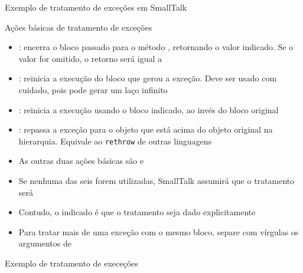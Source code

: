 \begin{frame}[fragile]{Exemplo de tratamento de exceções em SmallTalk}
\end{frame}


\begin{frame}[fragile]{Ações básicas de tratamento de exceções}

    \begin{itemize}
        \item {}: encerra o bloco passado para o método ,
            retornando o valor indicado. Se o valor for omitido, o retorno será igual a 

        \item {}: reinicia a execução do bloco que gerou a exceção. Deve ser
            usado com cuidado, pois pode gerar um laço infinito

        \item {}: reinicia a execução usando o bloco indicado, ao
            invés do bloco original

        \item {}: repassa a exceção para o objeto que está acima do objeto
            original na hierarquia. Equivale ao \texttt{rethrow} de outras linguagens

        \item As outras duas ações básicas são  e 

        \item Se nenhuma das seis forem utilizadas, SmallTalk assumirá que o tratamento será

        \item Contudo, o indicado é que o tratamento seja dado explicitamente

        \item Para tratar mais de uma exceção com o mesmo bloco, separe com vírgulas os argumentos de
     \end{itemize}

\end{frame}

\begin{frame}[fragile]{Exemplo de tratamento de execeções}
\end{frame}
